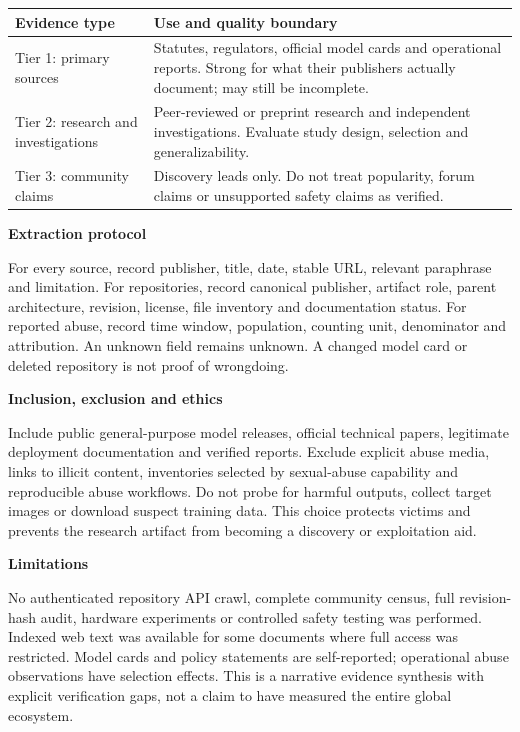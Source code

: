 \documentclass[10pt,a4paper]{article}
\newcommand{\sub}[1]{\vspace{1mm}\textbf{#1}\par}
\begin{document}
\begin{center}\small\begin{tabularx}{\linewidth}{@{}YY@{}}\toprule
\textbf{Evidence type} & \textbf{Use and quality boundary}\\\midrule
Tier 1: primary sources & Statutes, regulators, official model cards and operational reports. Strong for what their publishers actually document; may still be incomplete.\\
Tier 2: research and investigations & Peer-reviewed or preprint research and independent investigations. Evaluate study design, selection and generalizability.\\
Tier 3: community claims & Discovery leads only. Do not treat popularity, forum claims or unsupported safety claims as verified.\\\bottomrule\end{tabularx}\end{center}

\sub{Extraction protocol}

For every source, record publisher, title, date, stable URL, relevant paraphrase and limitation. For repositories, record canonical publisher, artifact role, parent architecture, revision, license, file inventory and documentation status. For reported abuse, record time window, population, counting unit, denominator and attribution. An unknown field remains unknown. A changed model card or deleted repository is not proof of wrongdoing.


\sub{Inclusion, exclusion and ethics}

Include public general-purpose model releases, official technical papers, legitimate deployment documentation and verified reports. Exclude explicit abuse media, links to illicit content, inventories selected by sexual-abuse capability and reproducible abuse workflows. Do not probe for harmful outputs, collect target images or download suspect training data. This choice protects victims and prevents the research artifact from becoming a discovery or exploitation aid.


\sub{Limitations}

No authenticated repository API crawl, complete community census, full revision-hash audit, hardware experiments or controlled safety testing was performed. Indexed web text was available for some documents where full access was restricted. Model cards and policy statements are self-reported; operational abuse observations have selection effects. This is a narrative evidence synthesis with explicit verification gaps, not a claim to have measured the entire global ecosystem.
\end{document}
